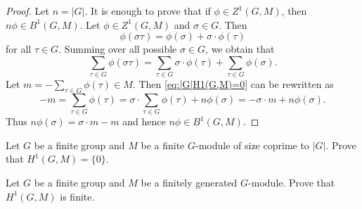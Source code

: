\begin{proof}
    Let $n=|G|$. It is enough to prove that 
    if $\phi\in Z^1(G,M)$, then $n\phi\in B^1(G,M)$. Let $\phi\in Z^1(G,M)$ and 
    $\sigma\in G$. Then 
    \[
    \phi(\sigma\tau)=\phi(\sigma)+\sigma\cdot\phi(\tau)
    \]
    for all $\tau\in G$. Summing over all possible $\sigma\in G$, we obtain that 
    \begin{equation}
        \label{eq:|G|H1(G,M)=0}    
        \sum_{\tau\in G}\phi(\sigma\tau)=\sum_{\tau\in G}\sigma\cdot\phi(\tau)+\sum_{\tau\in G}\phi(\sigma).
    \end{equation}
    Let $m=-\sum_{\tau\in G}\phi(\tau)\in M$. Then 
    \eqref{eq:|G|H1(G,M)=0} can be rewritten as 
    \[
    -m=\sum_{\tau\in G}\phi(\tau)=\sigma\cdot \sum_{\tau\in G}\phi(\tau)+n\phi(\sigma)
    =-\sigma\cdot m+n\phi(\sigma).
    \]
    Thus $n\phi(\sigma)=\sigma\cdot m-m$ and hence $n\phi\in B^1(G,M)$.  
\end{proof}

\begin{exercise}
    Let $G$ be a finite group and 
    $M$ be a finite $G$-module of size coprime to $|G|$. Prove that 
    $H^1(G,M)=\{0\}$. 
\end{exercise}

\begin{exercise}
    Let $G$ be a finite group and 
    $M$ be a finitely generated $G$-module. Prove that
    $H^1(G,M)$ is finite.
\end{exercise}

%    
%



